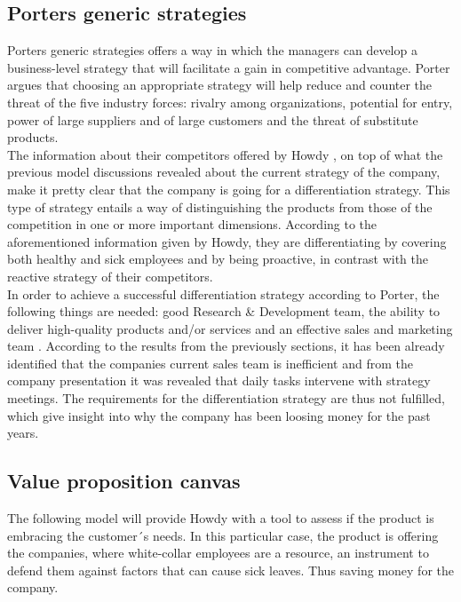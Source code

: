 \subsection{Porters generic strategies}
Porters generic strategies offers a way in which the managers can develop a business-level strategy that will facilitate a gain in competitive advantage\cite[p.190]{jones_george_2013}. Porter argues that choosing an appropriate strategy will help reduce and counter the threat of the five industry forces: rivalry among organizations, potential for entry, power of large suppliers and of large customers and the threat of substitute products\cite[p.189-190]{jones_george_2013}.\\
\noindent The information about their competitors offered by Howdy \cite{Extrainfo}, on top of what the previous model discussions revealed about the current strategy of the company, make it pretty clear that the company is going for a differentiation strategy. This type of strategy entails a way of distinguishing the products from those of the competition in one or more important dimensions\cite[p.191]{jones_george_2013}. According to the aforementioned information given by Howdy, they are differentiating by covering both healthy and sick employees and by being proactive, in contrast with the reactive strategy of their competitors. \\
\noindent In order to achieve a successful differentiation strategy according to Porter, the following things are needed: good Research \& Development team, the ability to deliver high-quality products and/or services and an effective sales and marketing team \cite{mind_tools_porter}. According to the results from the previously sections, it has been already identified that the companies current sales team is inefficient and from the company presentation\cite[s.11]{oneofthepresentations} it was revealed that daily tasks intervene with strategy meetings. The requirements for the differentiation strategy are thus not  fulfilled, which give insight into why the company has been loosing money for the past years. 

\subsection{Value proposition canvas}

The following model will provide Howdy with a tool to assess if the product is embracing the customer´s needs. In this particular case, the product is offering the companies, where white-collar employees are a resource, an instrument to defend them against factors that can cause sick leaves. Thus saving money for the company.

